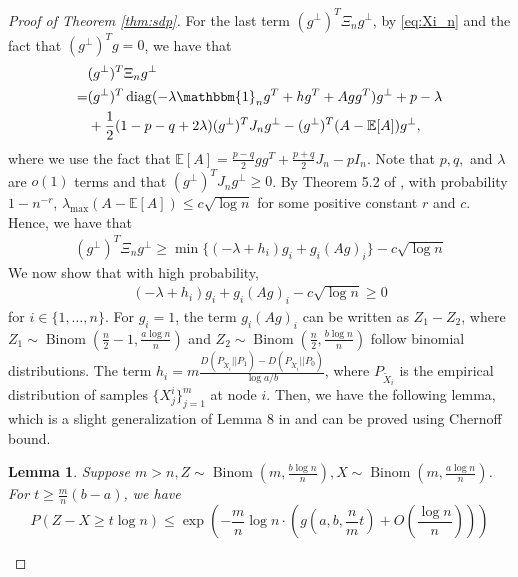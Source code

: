 \documentclass[conference]{IEEEtran}
\newtheorem{lemma}{Lemma}
\DeclareMathOperator{\diag}{diag}
\DeclareMathOperator{\Binom}{Binom}
\begin{document}
\begin{proof}[Proof of Theorem \ref{thm:sdp}]
	
	
	
	
	
	
	
	For the last term $(g^{\perp})^T \Xi_n g^{\perp}$, by \eqref{eq:Xi_n} and the fact that $(g^{\perp})^Tg=0$, we have that
	\begin{align*}
		&(g^{\perp})^T \Xi_n g^{\perp} \\
		=& (g^{\perp})^T \diag( -\lambda \mathbbm{1}_ng^T+hg^T + Agg^T) g^{\perp} + p -\lambda \\
		&+ \frac{1}{2}(1-p-q+2\lambda)(g^{\perp})^TJ_n g^{\perp}
		-(g^{\perp})^T(A-\mathbb{E}[A])g^{\perp},
	\end{align*}
	where we use the fact that $\mathbb{E}[A] = \frac{p-q}{2}gg^T + \frac{p+q}{2}J_n - pI_n$. Note that $p,q,$ and $\lambda$ are $o(1)$ terms and that $(g^{\perp})^TJ_n g^{\perp}\ge 0$. 
	By Theorem 5.2 of \cite{lei2015consistency},
	with probability $1-n^{-r}$, $\lambda_{\max}(A-\mathbb{E}[A]) \leq c\sqrt{\log n}$ for some positive constant $r$ and $c$. Hence, we have that
	\begin{align}\label{eq:lastterm}
		(g^{\perp})^T \Xi_n g^{\perp} \geq \min\{(-\lambda + h_i) g_i + g_i (Ag)_i \} - c \sqrt{\log n}
	\end{align}
	We now show that with high probability,
	\begin{align}\label{eq:nodei}
		(-\lambda + h_i) g_i + g_i (Ag)_i  - c \sqrt{\log n}\ge 0
	\end{align}
	for $i\in\{1,\ldots,n\}$. For $g_i=1$,
	the term $g_i(Ag)_i$ can be written as 
	$Z_1-Z_2$, where $Z_1\sim \Binom(\frac{n}{2}-1,\frac{a\log n}{n})$
	and $Z_2\sim \Binom(\frac{n}{2},\frac{b\log n}{n})$ 
	follow binomial distributions. The term $h_i=m \frac{D(P_{\widetilde{X}_i} || P_1) - D(P_{\widetilde{X}_i} || P_0) }{\log a /b}$, where $P_{\widetilde{X}_i}$ is the empirical distribution of samples $\{X^i_j\}^m_{j=1}$ at node $i$. Then, we have the following lemma, which is a slight generalization of Lemma 8 in \cite{abbe2015exact} and can be proved using Chernoff bound.
	\begin{lemma}\label{lem:zxt}
		Suppose $m > n, Z \sim \Binom(m, \frac{b\log n}{n}), X\sim \Binom(m, \frac{a\log n}{n})$.
		For $ t \geq \frac{m}{n}(b - a)$, we have
		\begin{equation}\label{eq:estimation}
			P(Z - X \geq t \log n) \leq \exp(-\frac{m}{n}\log n \cdot ( g(a, b, \frac{n}{m}t) + O(\frac{\log n}{n})))

\end{equation}
\end{lemma}
\end{proof}
\end{document}
